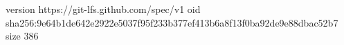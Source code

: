 version https://git-lfs.github.com/spec/v1
oid sha256:9e64b1de642e2922e5037f95f233b377ef413b6a8f13f0ba92de9e88dbac52b7
size 386
